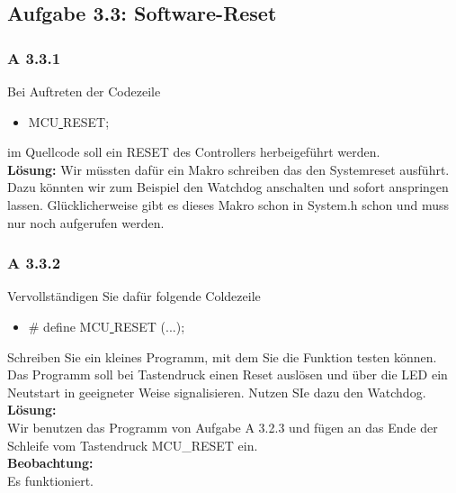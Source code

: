 \subsection*{Aufgabe 3.3: Software-Reset}

\subsubsection*{A 3.3.1}
	Bei Auftreten der Codezeile
	\begin{itemize}
		\item MCU\underline{ }RESET;
	\end{itemize}
	im Quellcode soll ein RESET des Controllers herbeigeführt werden.\\

	\textbf{Lösung:}
		Wir müssten dafür ein Makro schreiben das den Systemreset ausführt. Dazu könnten wir zum Beispiel den Watchdog anschalten und sofort 
		anspringen lassen. Glücklicherweise gibt es dieses Makro schon in System.h schon und muss nur noch aufgerufen werden.
\subsubsection*{A 3.3.2}
	Vervollständigen Sie dafür folgende Coldezeile
	\begin{itemize}
		\item \# define MCU\underline{ }RESET (...);
	\end{itemize}
	Schreiben Sie ein kleines Programm, mit dem Sie die Funktion testen können. Das Programm soll bei Tastendruck einen Reset auslösen und über die LED ein Neutstart in geeigneter Weise signalisieren. Nutzen SIe dazu den Watchdog.\\

	\textbf{Lösung:}\\
	Wir benutzen das Programm von Aufgabe A 3.2.3 und fügen an das Ende der Schleife vom Tastendruck MCU\_RESET ein.\\
	\textbf{Beobachtung:}\\
	Es funktioniert.
	
